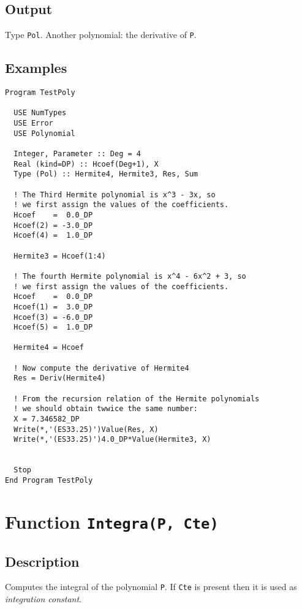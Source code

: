 \subsection{Output}

Type \texttt{Pol}. Another polynomial: the derivative of \texttt{P}.

\subsection{Examples}

\begin{verbatim}
Program TestPoly

  USE NumTypes
  USE Error
  USE Polynomial

  Integer, Parameter :: Deg = 4
  Real (kind=DP) :: Hcoef(Deg+1), X
  Type (Pol) :: Hermite4, Hermite3, Res, Sum

  ! The Third Hermite polynomial is x^3 - 3x, so
  ! we first assign the values of the coefficients.
  Hcoef    =  0.0_DP
  Hcoef(2) = -3.0_DP
  Hcoef(4) =  1.0_DP

  Hermite3 = Hcoef(1:4)

  ! The fourth Hermite polynomial is x^4 - 6x^2 + 3, so
  ! we first assign the values of the coefficients.
  Hcoef    =  0.0_DP
  Hcoef(1) =  3.0_DP
  Hcoef(3) = -6.0_DP
  Hcoef(5) =  1.0_DP

  Hermite4 = Hcoef

  ! Now compute the derivative of Hermite4
  Res = Deriv(Hermite4)

  ! From the recursion relation of the Hermite polynomials 
  ! we should obtain twwice the same number:
  X = 7.346582_DP
  Write(*,'(ES33.25)')Value(Res, X)
  Write(*,'(ES33.25)')4.0_DP*Value(Hermite3, X)
  

  Stop
End Program TestPoly
\end{verbatim}

\section{Function \texttt{Integra(P, Cte)}}

\subsection{Description}

Computes the integral of the polynomial \texttt{P}. If \texttt{Cte} is
present then it is used as \emph{integration constant}.

